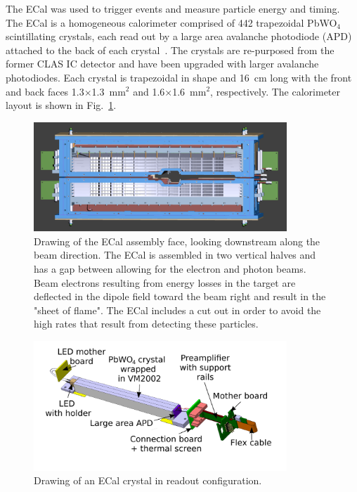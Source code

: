 The ECal was used to trigger events and measure particle energy and timing. The ECal is a homogeneous calorimeter comprised of 442 trapezoidal PbWO$_4$ scintillating crystals, each read out by a large area avalanche photodiode (APD) attached to the back of each crystal~\cite{Balossino201789}. The crystals are re-purposed from the former CLAS IC detector and have been upgraded with larger avalanche photodiodes. Each crystal is trapezoidal in shape and 16~cm long with the front and back faces 1.3$\times$1.3~mm$^2$ and 1.6$\times$1.6~mm$^2$, respectively. The calorimeter layout is shown in Fig.~\ref{Figure:ecalface}. 

\begin{figure}[h]
  \centering
      \includegraphics[width=0.85\textwidth]{pics/experiment/ecalface.png}
  \caption[Drawing of the ECal assembly face]{Drawing of the ECal assembly face, looking downstream along the beam direction. The ECal is assembled in two vertical halves and has a gap between allowing for the electron and photon beams. Beam electrons resulting from energy losses in the target are deflected in the dipole field toward the beam right and result in the "sheet of flame". The ECal includes a cut out in order to avoid the high rates that result from detecting these particles.}
  \label{Figure:ecalface}
\end{figure}

\begin{figure}[h]
  \centering
      \includegraphics[width=0.85\textwidth]{pics/experiment/crystal.png}
  \caption[Single ECal module]{Drawing of an ECal crystal in readout configuration.}
  \label{Figure:crystal}
\end{figure}

